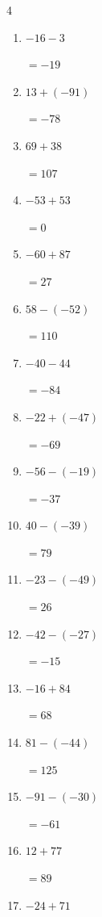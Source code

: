 \begin{multicols}{4}
\begin{enumerate}
        $=54$

  \item $-16-3$

        $=-19$

  \item $13+(-91)$

        $=-78$

  \item $69+38$

        $=107$

  \item $-53+53$

        $=0$

  \item $-60+87$

        $=27$

  \item $58-(-52)$

        $=110$

  \item $-40-44$

        $=-84$

  \item $-22+(-47)$

        $=-69$

  \item $-56-(-19)$

        $=-37$

  \item $40-(-39)$

        $=79$

  \item $-23-(-49)$

        $=26$

  \item $-42-(-27)$

        $=-15$

  \item $-16+84$

        $=68$

  \item $81-(-44)$

        $=125$

  \item $-91-(-30)$

        $=-61$

  \item $12+77$

        $=89$

\columnbreak %

  \item $-24+71$


\end{enumerate}
\end{multicols}
